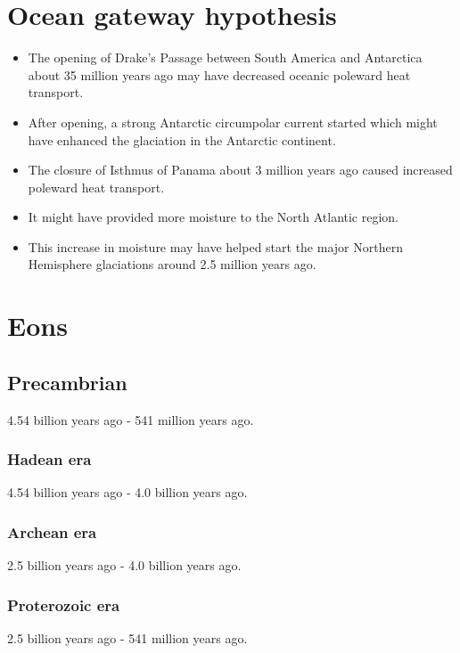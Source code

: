 \documentclass[11pt]{article}
\begin{document}
\newpage

\section{Ocean gateway hypothesis}
\label{sec:orgbe7761d}
\begin{itemize}
\item The opening of Drake's Passage between South America and Antarctica about 35 million years ago may have decreased oceanic poleward heat transport.
\item After opening, a strong Antarctic circumpolar current started which might have enhanced the glaciation in the Antarctic continent.
\item The closure of Isthmus of Panama about 3 million years ago caused increased poleward heat transport.
\item It might have provided more moisture to the North Atlantic region.
\item This increase in moisture may have helped start the major Northern Hemisphere glaciations around 2.5 million years ago.
\end{itemize}


\section{Eons}
\label{sec:org82eb52e}

\subsection{Precambrian}
\label{sec:orgc56b274}
4.54 billion years ago - 541 million years ago.

\subsubsection{Hadean era}
\label{sec:org4156a28}
4.54 billion years ago - 4.0 billion years ago.

\subsubsection{Archean era}
\label{sec:orgfcd6fee}
2.5 billion years ago - 4.0 billion years ago.

\subsubsection{Proterozoic era}
\label{sec:org5f3a3e0}
2.5 billion years ago - 541 million years ago.
\end{document}
